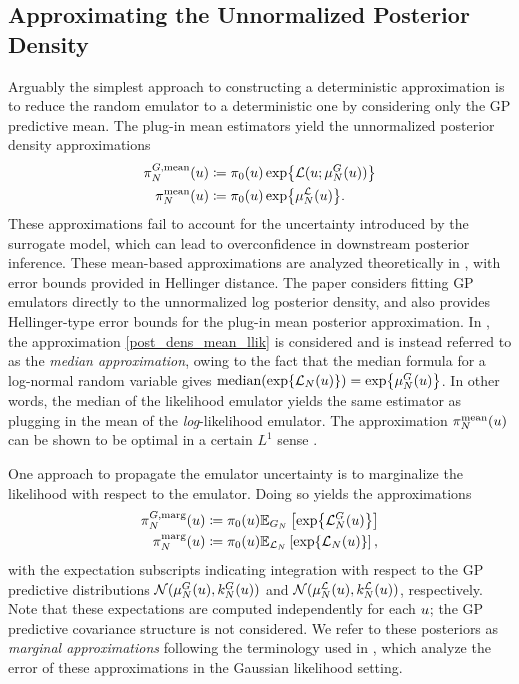 \documentclass[12pt]{article}
\begin{document}
\subsection{Approximating the Unnormalized Posterior Density}
Arguably the simplest approach to constructing a deterministic approximation is to reduce the random emulator 
to a deterministic one by considering only the GP predictive mean. 
The plug-in mean estimators yield the unnormalized posterior density approximations 
\begin{align}
\fwdEmMeanDens[\Ndesign](\Par) &\Def \priorDens(\Par) \Exp{\llik(\Par; \emMean[\Ndesign]{\fwd}(\Par))}
 \label{post_dens_mean_fwd} \\
\llikEmMeanDens[\Ndesign](\Par) &\Def \priorDens(\Par) \Exp{\emMean[\Ndesign]{\llik}(\Par)} 
\label{post_dens_mean_llik}.
\end{align}
These approximations fail to account for the uncertainty introduced by the surrogate model, which can lead 
to overconfidence in downstream posterior inference. These mean-based approximations are analyzed 
theoretically in \cite{StuartTeck1}, with error bounds provided in Hellinger distance. The paper 
\cite{gp_surrogates_random_exploration} considers fitting GP emulators directly to the unnormalized 
log posterior density, and also provides Hellinger-type error bounds for the plug-in mean posterior approximation.  
In \cite{VehtariParallelGP}, 
the approximation \ref{post_dens_mean_llik} is considered and is instead referred to as the 
\textit{median approximation}, owing to the fact that the median formula for a log-normal random variable 
gives $\text{median}(\Exp{\llikEm[\Ndesign](\Par)}) = \Exp{\emMean[\Ndesign]{\fwd}(\Par)}$. In other words, 
the median of the likelihood emulator yields the same estimator as plugging in the mean of the 
\textit{log}-likelihood emulator.
The approximation $\llikEmMeanDens[\Ndesign](\Par)$ can be shown to be optimal in a certain  
$L^1$ sense \cite{VehtariParallelGP, StuartTeck2}. 

One approach to propagate the 
emulator uncertainty is to marginalize the likelihood with respect to the emulator. Doing so yields the approximations 
\begin{align}
\fwdEmMargDens[\Ndesign](\Par) &\Def \priorDens(\Par) \E_{\fwdEm}\left[\Exp{\llikEmFwd[\Ndesign](\Par)} \right] \label{post_dens_marg_fwd} \\
\llikEmMargDens[\Ndesign](\Par) &\Def \priorDens(\Par) \E_{\llikEm}\left[\Exp{\llikEm[\Ndesign](\Par)} \right], \label{post_dens_marg_llik}
\end{align}
with the expectation subscripts indicating integration with respect to the GP predictive distributions 
$\Gaussian(\emMean[\Ndesign]{\fwd}(\Par), \emKer[\Ndesign]{\fwd}(\Par))$ and
$\Gaussian(\emMean[\Ndesign]{\llik}(\Par), \emKer[\Ndesign]{\llik}(\Par))$, respectively. Note that these expectations are 
computed independently for each $\Par$; the GP predictive covariance structure is not considered. 
We refer to these posteriors as \textit{marginal approximations} following the terminology used in
 \cite{StuartTeck1, StuartTeck2}, which analyze the error of these approximations in the Gaussian likelihood setting. 
\end{document}
